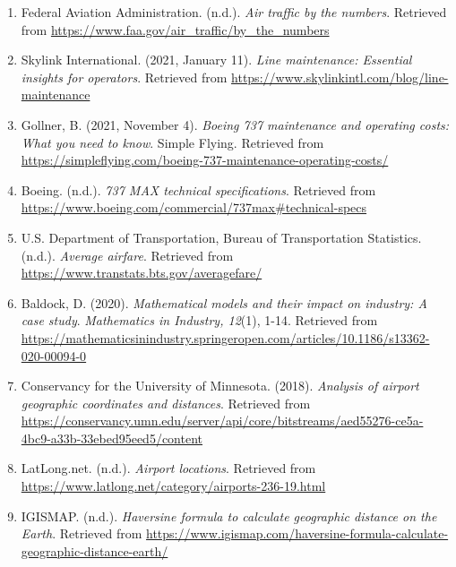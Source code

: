 \documentclass{article}
\begin{document}
\begin{enumerate}
    \item Federal Aviation Administration. (n.d.). \textit{Air traffic by the numbers}. Retrieved from \url{https://www.faa.gov/air_traffic/by_the_numbers}
    
    \item Skylink International. (2021, January 11). \textit{Line maintenance: Essential insights for operators}. Retrieved from \url{https://www.skylinkintl.com/blog/line-maintenance}
    
    \item Gollner, B. (2021, November 4). \textit{Boeing 737 maintenance and operating costs: What you need to know}. Simple Flying. Retrieved from \url{https://simpleflying.com/boeing-737-maintenance-operating-costs/}
    
    \item Boeing. (n.d.). \textit{737 MAX technical specifications}. Retrieved from \url{https://www.boeing.com/commercial/737max#technical-specs}
    
    \item U.S. Department of Transportation, Bureau of Transportation Statistics. (n.d.). \textit{Average airfare}. Retrieved from \url{https://www.transtats.bts.gov/averagefare/}
    
    \item Baldock, D. (2020). \textit{Mathematical models and their impact on industry: A case study}. \textit{Mathematics in Industry, 12}(1), 1-14. Retrieved from \url{https://mathematicsinindustry.springeropen.com/articles/10.1186/s13362-020-00094-0}
    
    \item Conservancy for the University of Minnesota. (2018). \textit{Analysis of airport geographic coordinates and distances}. Retrieved from \url{https://conservancy.umn.edu/server/api/core/bitstreams/aed55276-ce5a-4bc9-a33b-33ebed95eed5/content}
    
    \item LatLong.net. (n.d.). \textit{Airport locations}. Retrieved from \url{https://www.latlong.net/category/airports-236-19.html}
    
    \item IGISMAP. (n.d.). \textit{Haversine formula to calculate geographic distance on the Earth}. Retrieved from \url{https://www.igismap.com/haversine-formula-calculate-geographic-distance-earth/}
\end{enumerate}
\end{document}
